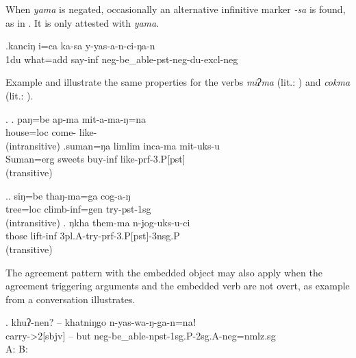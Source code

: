 When  \emph{yama} is negated, occasionally an alternative infinitive marker \emph{-sa} is found, as in \Next. It is only attested with \emph{yama}.

\exg.kanciŋ  i=ca ka-sa y-yas-a-n-ci-ŋa-n\\
{\sc 1du} what{\sc =add} say{\sc -inf} {\sc neg-}be\_able{\sc -pst-neg-du-excl-neg}\\
 


Example \Next  and \NNext illustrate  the same properties for  the verbs \emph{miʔma}  (lit.: ) and  \emph{cokma}  (lit.: ). 

\ex. \ag.   paŋ=be     ap-ma            mit-a-ma-ŋ=na\\  
	house{\sc =loc} come- like-\\
	 (intransitive) 
\bg.suman=ŋa    limlim inca-ma    mit-uks-u\\
Suman{\sc =erg} sweets  buy{\sc -inf}  like{\sc [3sg.A]-prf-3.P[pst]}\\
	 (transitive) 

\ex.\ag.  siŋ=be    thaŋ-ma=ga       cog-a-ŋ\\
tree{\sc =loc} climb{\sc -inf=gen} try{\sc -pst-1sg}\\
  (intransitive) 
\bg. ŋkha them-ma     n-jog-uks-u-ci\\
those lift{\sc -inf} {\sc 3pl.A-}try{\sc -prf-3.P[pst]-3nsg.P}\\
  (transitive) 


The agreement pattern with the embedded object may also apply when the agreement triggering arguments and the embedded verb are not overt, as example \Next from a conversation illustrates.

\exg. khuʔ-nen? – khatniŋgo n-yas-wa-ŋ-ga-n=naǃ\\
carry-{>2[sbjv]}  – but {\sc neg}-be\_able-{\sc npst-1sg.P-2sg.A-neg=nmlz.sg}\\
A:  B: 


